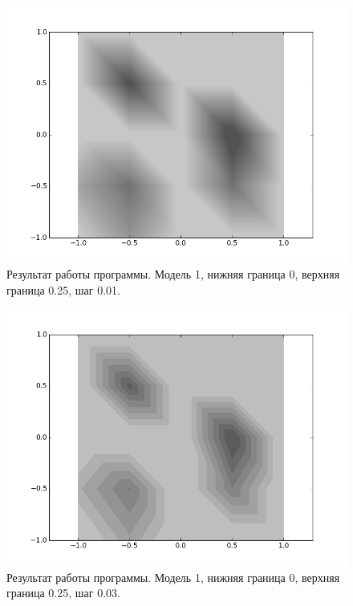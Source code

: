 \documentclass[12pt,a4paper,oneside]{extarticle}
\begin{document}
    \begin{figure}[h!]
        \center
        \includegraphics[scale=0.5]{mini1.png}
        \caption{Результат работы программы. Модель 1, нижняя граница 0, верхняя граница 0.25, шаг 0.01.}
        \label{pic:mini1}
    \end{figure}

    \begin{figure}[h!]
        \center
        \includegraphics[scale=0.5]{mini2.png}
        \caption{Результат работы программы. Модель 1, нижняя граница 0, верхняя граница 0.25, шаг 0.03.}
        \label{pic:mini2}
    \end{figure}
\end{document}
